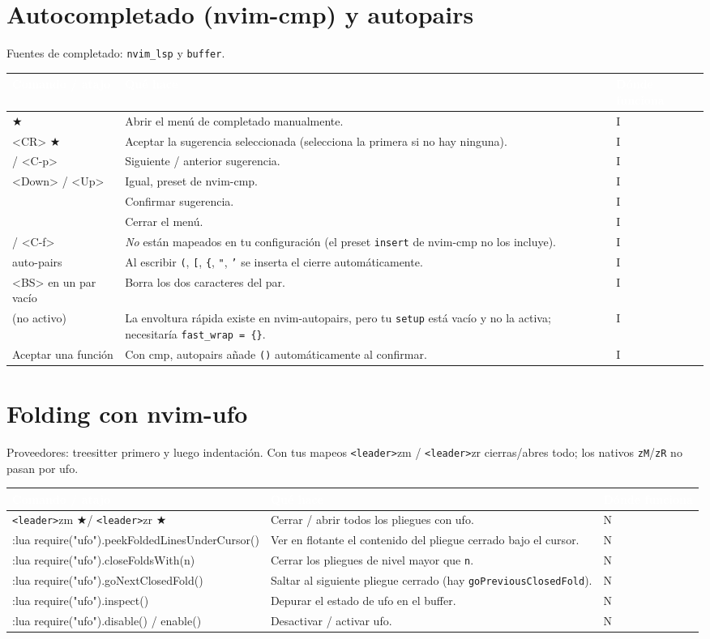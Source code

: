 \documentclass[8pt,a4paper,landscape]{extarticle}
\newcommand{\kk}[1]{\texttt{#1}}
\newcommand{\ld}{\texttt{<leader>}}
\newcommand{\mk}{\textcolor{mine}{$\bigstar$}}   %
\newenvironment{cht}{%
  \begin{longtable}{>{\raggedright\arraybackslash\ttfamily}p{0.27\textwidth}
                    >{\raggedright\arraybackslash}p{0.46\textwidth}
                    >{\raggedright\arraybackslash}p{0.21\textwidth}}
  \rowcolor{accent}\textcolor{white}{\textbf{\rmfamily Comando / atajo}} &
  \textcolor{white}{\textbf{Qué hace}} & \textcolor{white}{\textbf{Dónde funciona}} \\
  \endhead
}{\end{longtable}}
\newcommand{\rr}[3]{#1 & #2 & #3 \\}
\newcommand{\rg}[3]{\rowcolor{rowgray}\relax #1 & #2 & #3 \\}
\let\oldsection\section
\renewcommand{\section}{\Needspace{10\baselineskip}\oldsection}
\begin{document}
\section{Autocompletado (nvim-cmp) y autopairs}
Fuentes de completado: \kk{nvim\_lsp} y \kk{buffer}.
\begin{cht}
\rg{<C-Space> \mk}{Abrir el menú de completado manualmente.}{I}
\rr{<CR> \mk}{Aceptar la sugerencia seleccionada (selecciona la primera si no hay ninguna).}{I}
\rg{<C-n> / <C-p>}{Siguiente / anterior sugerencia.}{I}
\rr{<Down> / <Up>}{Igual, preset de nvim-cmp.}{I}
\rg{<C-y>}{Confirmar sugerencia.}{I}
\rr{<C-e>}{Cerrar el menú.}{I}
\rg{<C-b> / <C-f>}{\emph{No} están mapeados en tu configuración (el preset \kk{insert} de nvim-cmp no los incluye).}{I}
\rr{auto-pairs}{Al escribir \kk{(}, \kk{[}, \kk{\{}, \kk{"}, \kk{'} se inserta el cierre automáticamente.}{I}
\rg{<BS> en un par vacío}{Borra los dos caracteres del par.}{I}
\rr{<A-e> (no activo)}{La envoltura rápida existe en nvim-autopairs, pero tu \kk{setup} está vacío y no la activa; necesitaría \kk{fast\_wrap = \{\}}.}{I}
\rg{Aceptar una función}{Con cmp, autopairs añade \kk{()} automáticamente al confirmar.}{I}
\end{cht}

\section{Folding con nvim-ufo}
Proveedores: treesitter primero y luego indentación. Con tus mapeos \ld zm / \ld zr cierras/abres todo; los nativos \kk{zM}/\kk{zR} no pasan por ufo.
\begin{cht}
\rg{\ld zm \mk / \ld zr \mk}{Cerrar / abrir todos los pliegues con ufo.}{N}
\rr{:lua require("ufo").peekFoldedLinesUnderCursor()}{Ver en flotante el contenido del pliegue cerrado bajo el cursor.}{N}
\rg{:lua require("ufo").closeFoldsWith(n)}{Cerrar los pliegues de nivel mayor que \kk{n}.}{N}
\rr{:lua require("ufo").goNextClosedFold()}{Saltar al siguiente pliegue cerrado (hay \kk{goPreviousClosedFold}).}{N}
\rg{:lua require("ufo").inspect()}{Depurar el estado de ufo en el buffer.}{N}
\rr{:lua require("ufo").disable() / enable()}{Desactivar / activar ufo.}{N}
\end{cht}

\end{document}

